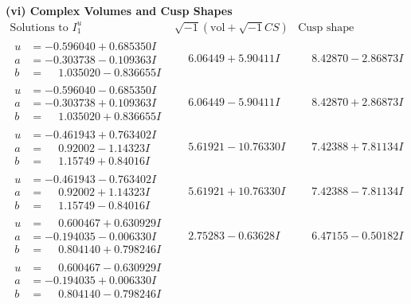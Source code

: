 \documentclass[1p]{elsarticle_modified}
\theoremstyle{definition}
\newcommand{\I}{\sqrt{-1}}
\begin{document}
\newpage\flushleft \textbf{(vi) Complex Volumes and Cusp Shapes}
$$\begin{array}{c|c|c}  
\text{Solutions to }I^u_{1}& \I (\text{vol} + \sqrt{-1}CS) & \text{Cusp shape}\\
 \hline 
\begin{aligned}
u &= -0.596040 + 0.685350 I \\
a &= -0.303738 - 0.109363 I \\
b &= \phantom{-}1.035020 - 0.836655 I\end{aligned}
 & \phantom{-}6.06449 + 5.90411 I & \phantom{-}8.42870 - 2.86873 I \\ \hline\begin{aligned}
u &= -0.596040 - 0.685350 I \\
a &= -0.303738 + 0.109363 I \\
b &= \phantom{-}1.035020 + 0.836655 I\end{aligned}
 & \phantom{-}6.06449 - 5.90411 I & \phantom{-}8.42870 + 2.86873 I \\ \hline\begin{aligned}
u &= -0.461943 + 0.763402 I \\
a &= \phantom{-}0.92002 - 1.14323 I \\
b &= \phantom{-}1.15749 + 0.84016 I\end{aligned}
 & \phantom{-}5.61921 - 10.76330 I & \phantom{-}7.42388 + 7.81134 I \\ \hline\begin{aligned}
u &= -0.461943 - 0.763402 I \\
a &= \phantom{-}0.92002 + 1.14323 I \\
b &= \phantom{-}1.15749 - 0.84016 I\end{aligned}
 & \phantom{-}5.61921 + 10.76330 I & \phantom{-}7.42388 - 7.81134 I \\ \hline\begin{aligned}
u &= \phantom{-}0.600467 + 0.630929 I \\
a &= -0.194035 - 0.006330 I \\
b &= \phantom{-}0.804140 + 0.798246 I\end{aligned}
 & \phantom{-}2.75283 - 0.63628 I & \phantom{-}6.47155 - 0.50182 I \\ \hline\begin{aligned}
u &= \phantom{-}0.600467 - 0.630929 I \\
a &= -0.194035 + 0.006330 I \\
b &= \phantom{-}0.804140 - 0.798246 I\end{aligned}

\end{array}$$
\end{document}
